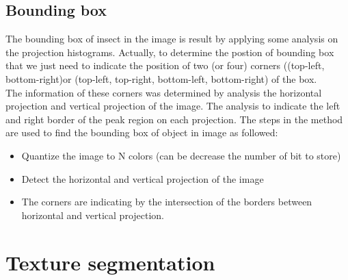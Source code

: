 \subsection{Bounding box}
The bounding box of insect in the image is result by applying some analysis on the projection histograms. Actually, to determine the postion of bounding box that we just need to indicate the position of two (or four) corners ((top-left, bottom-right)or (top-left, top-right, bottom-left, bottom-right) of the box.\\[0.2cm]
The information of these corners was determined by analysis the horizontal projection and vertical projection of the image. The analysis to indicate the left and right border of the peak region on each projection. The steps in the method are used to find the bounding box of object in image as followed:
\begin{itemize}
	\item Quantize the image to N colors (can be decrease the number of bit to store)
	\item Detect the horizontal and vertical projection of the image
	\item The corners are indicating by the intersection of the borders between horizontal and vertical projection.
\end{itemize}
\section{Texture segmentation}
